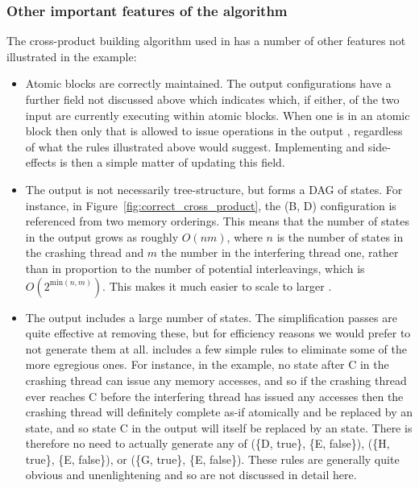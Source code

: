 \subsubsection{Other important features of the algorithm}

The cross-product building algorithm used in {\implementation} has a
number of other features not illustrated in the example:

\begin{itemize}
\item
  Atomic blocks are correctly maintained.  The output {\StateMachine}
  configurations have a further field not discussed above which
  indicates which, if either, of the two input {\StateMachines} are
  currently executing within atomic blocks.  When one {\StateMachine}
  is in an atomic block then only that {\StateMachine} is allowed to
  issue operations in the output {\StateMachine}, regardless of what
  the rules illustrated above would suggest.  Implementing
  {\stStartAtomic} and {\stEndAtomic} side-effects is then a
  simple matter of updating this field.

\item The output {\StateMachine} is not necessarily tree-structure,
  but forms a DAG of states.  For instance, in
  Figure~\ref{fig:correct_cross_product}, the (B, D) configuration is
  referenced from two memory orderings.  This means that the number of
  states in the output {\StateMachine} grows as roughly $O(nm)$, where
  $n$ is the number of states in the crashing thread {\StateMachine}
  and $m$ the number in the interfering thread one, rather than in
  proportion to the number of potential interleavings, which is
  $O(2^{\mathrm{min}(n,m)})$.  This makes it much easier to scale
  {\technique} to larger {\StateMachines}.

\item The output {\StateMachine} includes a large number of
  {\stUnreached} states.  The {\StateMachine} simplification passes
  are quite effective at removing these, but for efficiency reasons we
  would prefer to not generate them at all.  {\Implementation}
  includes a few simple rules to eliminate some of the more egregious
  ones.  For instance, in the example, no state after C in the
  crashing thread {\StateMachine} can issue any memory accesses, and
  so if the crashing thread ever reaches C before the interfering
  thread has issued any accesses then the crashing thread will
  definitely complete as-if atomically and be replaced by an
  {\stUnreached} state, and so state C in the output
        {\StateMachine} will itself be replaced by an
        {\stUnreached} state.  There is therefore no need to
        actually generate any of (\{D, true\}, \{E, false\}), (\{H,
        true\}, \{E, false\}), or (\{G, true\}, \{E, false\}).  These
        rules are generally quite obvious and unenlightening and so
        are not discussed in detail here.
\end{itemize}

